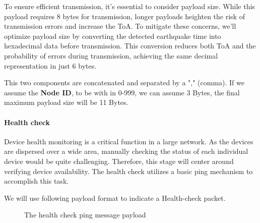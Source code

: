 

To ensure efficient transmission, it's essential to consider payload size. While this payload requires 8 bytes for transmission, longer payloads heighten the risk of transmission errors and increase the \ac{ToA}. To mitigate these concerns, we'll optimize payload size by converting the detected earthquake time into hexadecimal data before transmission. This conversion reduces both \ac{ToA} and the probability of errors during transmission, achieving the same decimal representation in just 6 bytes.

This two components are concatenated and separated by a "," (comma). If we assume the \textbf{Node ID}, to be with in 0-999, we can assume 3 Bytes, the final maximum payload size will be 11 Bytes.

\paragraph{Health check}\label{par:Health}
Device health monitoring is a critical function in a large network. As the devices are dispersed over a wide area, manually checking the status of each individual device would be quite challenging. Therefore, this stage will center around verifying device availability. The health check utilizes a basic ping mechanism to accomplish this task.

We will use following payload format to indicate a Health-check packet.

\begin{figure}[ht!]
    \centering
    
    \caption{The health check ping message payload}
    \label{fig:healthck}
\end{figure}


